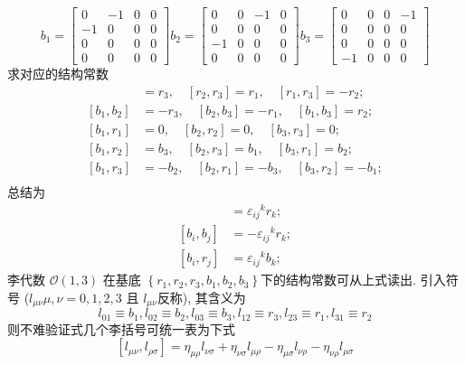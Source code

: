 \documentclass[../main.tex]{subfiles}
\begin{document}
     $$b_1=\begin{bmatrix}
     0 & -1& 0 & 0 \\
     -1  & 0  & 0 & 0 \\
     0 & 0 & 0 & 0 \\
     0 & 0 & 0 & 0
     \end{bmatrix}
     b_2=\begin{bmatrix}
     0  & 0 & -1  & 0 \\
     0 & 0 & 0 & 0 \\
     -1  & 0 & 0  & 0 \\
     0 & 0 & 0 & 0
     \end{bmatrix}
     b_3=\begin{bmatrix}
     0  & 0 & 0 & -1  \\
     0 & 0 & 0 & 0 \\
     0 & 0 & 0 & 0 \\
     -1  & 0 & 0 & 0 
     \end{bmatrix}$$
 求对应的结构常数
 \begin{align*}
     [r_1,r_2] &= r_3,\quad
     [r_2,r_3] = r_1,\quad
     [r_1,r_3] = -r_2; \\
     [b_1,b_2] &= -r_3,\quad
     [b_2,b_3] = -r_1,\quad
     [b_1,b_3] = r_2;\\
     [b_1,r_1] &= 0,\quad
     [b_2,r_2] = 0,\quad
     [b_3,r_3] = 0 ;\\
     [b_1,r_2] &= b_3,\quad
     [b_2,r_3] = b_1 ,\quad
     [b_3,r_1] = b_2;\\    
     [b_1,r_3] &= -b_2,\quad
     [b_2,r_1] = -b_3,\quad
     [b_3,r_2] = -b_1;\\
 \end{align*}  
 总结为
 \begin{align*}
     [r_i,r_j] &= \varepsilon_{ij}{}^{k}r_k;\\
     [b_i,b_j] &= -\varepsilon_{ij}{}^{k}r_k;\\
     [b_i,r_j] &= \varepsilon_{ij}{}^{k}b_k;
 \end{align*} 
 李代数 $\mathscr{O}(1,3)$ 在基底 $\left\{r_{1}, r_{2}, r_{3}, b_{1}, b_{2}, b_{3}\right\} $下的结构常数可从上式读出.
 引入符号 ($l_{\mu \nu}\mu, \nu=0,1,2,3$ 且 $l_{\mu \nu}$反称), 其含义为
 $$l_{01} \equiv b_{1}, l_{02} \equiv b_{2}, l_{03} \equiv b_{3}, l_{12} \equiv r_{3}, l_{23} \equiv r_{1}, l_{31} \equiv r_{2}$$
 则不难验证式几个李括号可统一表为下式
 $$\left[l_{\mu \nu}, l_{\rho \sigma}\right]=\eta_{\mu \rho} l_{\nu \sigma}+\eta_{\nu \sigma} l_{\mu \rho}-\eta_{\mu \sigma} l_{\nu \rho}-\eta_{\nu \rho} l_{\mu \sigma}$$
\end{document}
